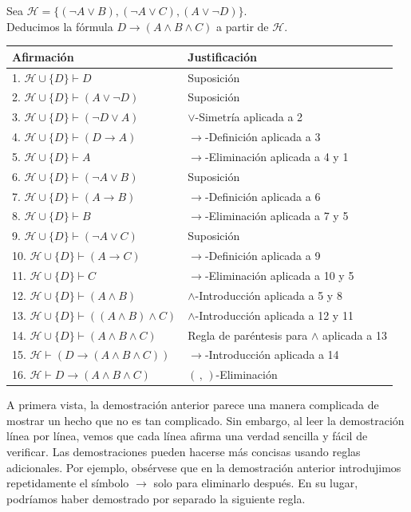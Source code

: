 \documentclass[12pt,a4paper]{book}
\makeatletter
\newcommand{\HH}{\mathcal{H}}
\newenvironment{derivacion}{%
  \begingroup
  \renewcommand{\arraystretch}{1.35}
  \begin{center}
  \begin{tabular}{@{}l l@{}}
    \textbf{Afirmación} & \textbf{Justificación}\\
    \hline
}{%
  \end{tabular}
  \end{center}
  \endgroup
}
\makeatother
\begin{document}
    \begin{ejemplo}\label{ej:demostracion-formal-ejemplo}
        Sea $\HH=\{(\neg A\vee B),(\neg A\vee C),(A\vee\neg D)\}$.\\
        Deducimos la fórmula $D\rightarrow(A\wedge B\wedge C)$ a partir de $\HH$.

        \begin{derivacion}
            1. $\HH\cup\{D\}\vdash D$ & Suposición\\
            2. $\HH\cup\{D\}\vdash(A\vee\neg D)$ & Suposición\\
            3. $\HH\cup\{D\}\vdash(\neg D\vee A)$ & $\vee$-Simetría aplicada a 2\\
            4. $\HH\cup\{D\}\vdash(D\rightarrow A)$ & $\rightarrow$-Definición aplicada a 3\\
            5. $\HH\cup\{D\}\vdash A$ & $\rightarrow$-Eliminación aplicada a 4 y 1\\
            6. $\HH\cup\{D\}\vdash(\neg A\vee B)$ & Suposición\\
            7. $\HH\cup\{D\}\vdash(A\rightarrow B)$ & $\rightarrow$-Definición aplicada a 6\\
            8. $\HH\cup\{D\}\vdash B$ & $\rightarrow$-Eliminación aplicada a 7 y 5\\
            9. $\HH\cup\{D\}\vdash(\neg A\vee C)$ & Suposición\\
            10. $\HH\cup\{D\}\vdash(A\rightarrow C)$ & $\rightarrow$-Definición aplicada a 9\\
            11. $\HH\cup\{D\}\vdash C$ & $\rightarrow$-Eliminación aplicada a 10 y 5\\
            12. $\HH\cup\{D\}\vdash(A\wedge B)$ & $\wedge$-Introducción aplicada a 5 y 8\\
            13. $\HH\cup\{D\}\vdash((A\wedge B)\wedge C)$ & $\wedge$-Introducción aplicada a 12 y 11\\
            14. $\HH\cup\{D\}\vdash(A\wedge B\wedge C)$ & Regla de paréntesis para $\wedge$ aplicada a 13\\
            15. $\HH\vdash(D\rightarrow(A\wedge B\wedge C))$ & $\rightarrow$-Introducción aplicada a 14\\
            16. $\HH\vdash D\rightarrow(A\wedge B\wedge C)$ & $(\,,\,)$-Eliminación\\
        \end{derivacion}
    \end{ejemplo}

    A primera vista, la demostración anterior parece una manera complicada de mostrar un hecho que no es tan complicado. Sin
    embargo, al leer la demostración línea por línea, vemos que cada línea afirma una verdad sencilla y fácil de verificar. Las
    demostraciones pueden hacerse más concisas usando reglas adicionales. Por ejemplo, obsérvese que en la demostración anterior
    introdujimos repetidamente el símbolo $\rightarrow$ solo para eliminarlo después. En su lugar, podríamos haber demostrado por
    separado la siguiente regla.
\end{document}

